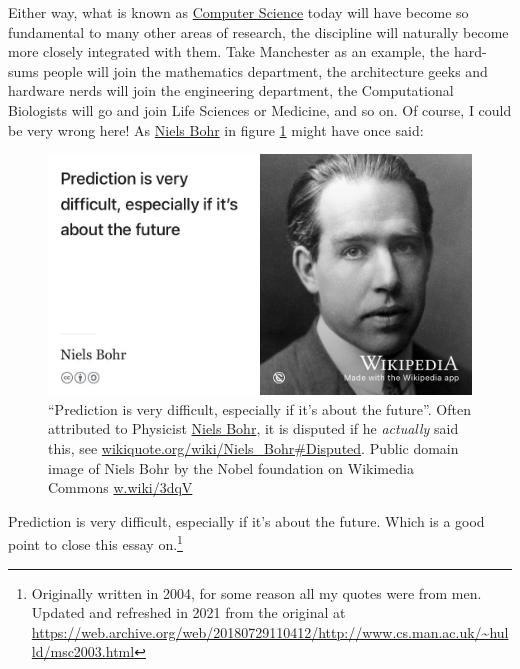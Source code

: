 \documentclass[
  12pt,
]{book}
\begin{document}
Either way, what is known as \href{https://en.wikipedia.org/wiki/Computer_science}{Computer Science} today will have become so fundamental to many other areas of research, the discipline will naturally become more closely integrated with them. Take Manchester as an example, the hard-sums people will join the mathematics department, the architecture geeks and hardware nerds will join the engineering department, the Computational Biologists will go and join Life Sciences or Medicine, and so on. Of course, I could be very wrong here! As \href{https://en.wikipedia.org/wiki/Niels_Bohr}{Niels Bohr} in figure \ref{fig:bohr-fig} might have once said:

\begin{figure}

{\centering \includegraphics[width=0.99\linewidth]{images/niels-bohr-prediction} 

}

\caption{``Prediction is very difficult, especially if it's about the future''. Often attributed to Physicist \href{https://en.wikipedia.org/wiki/Niels_Bohr}{Niels Bohr}, it is disputed if he \emph{actually} said this, see \href{https://en.wikiquote.org/wiki/Niels_Bohr\#Disputed}{wikiquote.org/wiki/Niels\_Bohr\#Disputed}. Public domain image of Niels Bohr by the Nobel foundation on Wikimedia Commons \href{https://w.wiki/3dqV}{w.wiki/3dqV}}\label{fig:bohr-fig}
\end{figure}



Prediction is very difficult, especially if it's about the future. Which is a good point to close this essay on.\footnote{Originally written in 2004, for some reason all my quotes were from men. Updated and refreshed in 2021 from the original at \url{https://web.archive.org/web/20180729110412/http://www.cs.man.ac.uk/~hulld/msc2003.html}}

  
\end{document}

